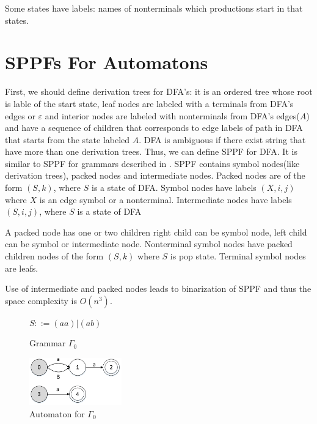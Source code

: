 \documentclass[runningheads,a4paper]{llncs}
\begin{document}
Some states have labels: names of nonterminals which productions start in that states.

\section{SPPFs For Automatons}%

First, we should define derivation trees for DFA's: it is an ordered tree whose root is lable of the start state,
leaf nodes are labeled with a terminals from DFA's edges or $\varepsilon$ and interior nodes are labeled with 
nonterminals from DFA's edges($ A $) and have a sequence of children that corresponds to edge labels of path in 
DFA that starts from the state labeled $ A $.
DFA is ambiguous if there exist string that have more than one derivation trees. Thus, we can define SPPF for DFA. 
It is similar to SPPF for grammars described in \cite{scott2013gll}. SPPF contains symbol nodes(like derivation trees), packed nodes
and intermediate nodes. 
Packed nodes are of the form $(S, k)$, where $S$ is a state of DFA. 
Symbol nodes have labels $(X, i, j)$ where $X$ is an edge symbol or a nonterminal. 
Intermediate nodes have labels $ (S, i, j) $, where $S$ is a state of DFA

A packed node has one or two children right child can be symbol node, left child can be symbol or intermediate node.   
Nonterminal symbol nodes have packed children nodes of the form $(S, k)$ where $S$ is pop state. 
Terminal symbol nodes are leafs.

 Use of intermediate and packed nodes leads to binarization of SPPF and thus the space complexity is $O(n^{3})$.

\begin{figure}
    \centering
    \parbox{2.9cm}{
        \begin{center}
            $S ::= (aa)|(ab)$
        \end{center}
        \caption{Grammar $\Gamma_{0}$}
        \label{fig:grammarG0}}
    \qquad
    \begin{minipage}{4cm}
        \includegraphics[width=4cm]{pictures/automatonForG0.pdf}
        \caption{Automaton for $\Gamma_{0}$}
        \label{fig:automatonForG0}
    \end{minipage}
\end{figure}
\end{document}
